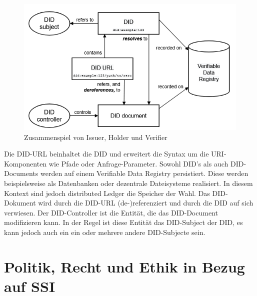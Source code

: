 \begin{figure}[h]
	\centering
	\includegraphics[scale=0.9]{media/DID.PNG}
	\caption{Zusammenspiel von Issuer, Holder und Verifier \cite{ID18}}
	\label{fig:meine-grafik}
\end{figure}

Die DID-URL beinhaltet die DID und erweitert die Syntax um die URI-Komponenten wie Pfade oder Anfrage-Parameter. Sowohl DID's als auch DID-Documents werden auf einem Verifiable Data Registry persistiert. Diese werden beispielsweise als Datenbanken oder dezentrale Dateisysteme realisiert. In diesem Kontext sind jedoch distributed Ledger die Speicher der Wahl. Das DID-Dokument wird durch die DID-URL (de-)referenziert und durch die DID auf sich verwiesen. Der DID-Controller ist die Entität, die das DID-Document modifizieren kann. In der Regel ist diese Entität das DID-Subject der DID, es kann jedoch auch ein ein oder mehrere andere DID-Subjecte sein.


\section{Politik, Recht und Ethik in Bezug auf SSI}

